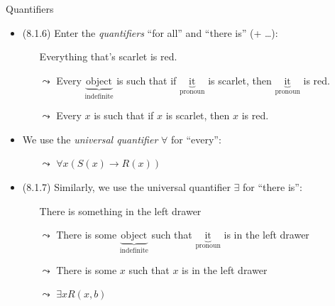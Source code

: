 \begin{frame}{Quantifiers}

	\begin{itemize}
	
		\item (8.1.6) Enter the \emph{quantifiers} ``for all'' and ``there is'' (+ \dots):
		
		\begin{itemize}
		\item[] Everything that's scarlet is red.
		\item[$\leadsto$] Every $\underbrace{\text{object}}_{\text{indefinite}}$ is such that if $\underbrace{\text{it}}_{\text{pronoun}}$ is scarlet, then $\underbrace{\text{it}}_{\text{pronoun}}$ is red.
		\item[$\leadsto$] Every $x$ is such that if $x$ is scarlet, then $x$ is red.
		\end{itemize}
		
		\item We use the \emph{universal quantifier} $\forall$ for ``every'': 
	
		\begin{itemize}
		\item[$\leadsto$] $\forall x(S(x)\to R(x))$
		\end{itemize}
	
		\item (8.1.7) Similarly, we use the universal quantifier $\exists$ for ``there is'':
		
		\begin{itemize}
		
			\item[] There is something in the left drawer
			\item[$\leadsto$] There is some $\underbrace{\text{object}}_{\text{indefinite}}$ such that $\underbrace{\text{it}}_{\text{pronoun}}$ is in the left drawer
			\item[$\leadsto$] There is some $x$ such that $x$ is in the left drawer
			
			\item[$\leadsto$] $\exists xR(x,b)$
			
		\end{itemize}
	
	\end{itemize}

\end{frame}


